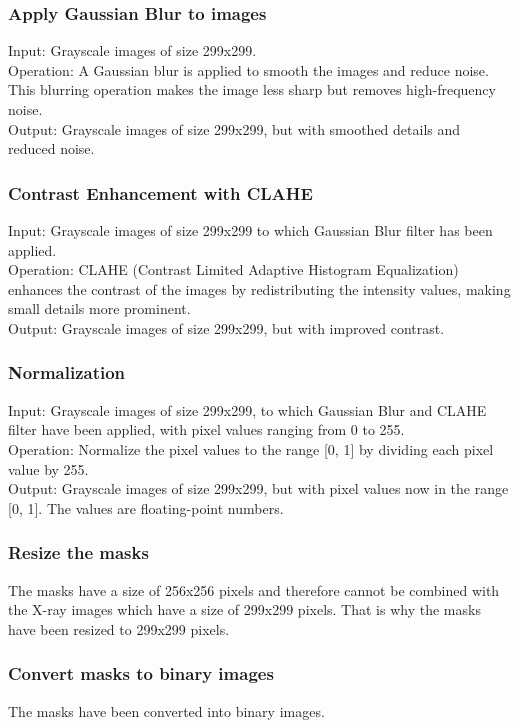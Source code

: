 \documentclass{article}
\begin{document}
\subsubsection{Apply Gaussian Blur to images}
Input: Grayscale images of size 299x299.\\
Operation: A Gaussian blur is applied to smooth the images and reduce noise. This blurring operation makes the image less sharp but removes high-frequency noise.\\
Output: Grayscale images of size 299x299, but with smoothed details and reduced noise.\\

\subsubsection{Contrast Enhancement with CLAHE}
Input: Grayscale images of size 299x299 to which Gaussian Blur filter has been applied.\\
Operation: CLAHE (Contrast Limited Adaptive Histogram Equalization) enhances the contrast of the images by redistributing the intensity values, making small details more prominent.\\
Output: Grayscale images of size 299x299, but with improved contrast.\\

\subsubsection{Normalization}
Input: Grayscale images of size 299x299, to which Gaussian Blur and CLAHE filter have been applied, with pixel values ranging from 0 to 255.\\
Operation: Normalize the pixel values to the range [0, 1] by dividing each pixel value by 255.\\
Output: Grayscale images of size 299x299, but with pixel values now in the range [0, 1]. The values are floating-point numbers.\\

\subsubsection{Resize the masks}
The masks have a size of 256x256 pixels and therefore cannot be combined with the X-ray images which have a size of 299x299 pixels. 
That is why the masks have been resized to 299x299 pixels.

\subsubsection{Convert masks to binary images}
The masks have been converted into binary images. 
\end{document}
